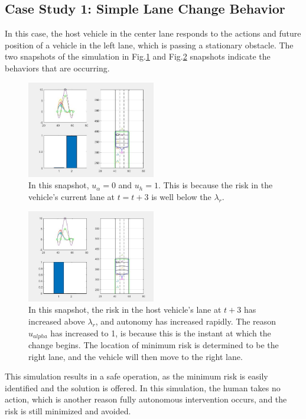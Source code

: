 \documentclass[conference]{IEEEtran}
\begin{document}
\subsection{Case Study 1: Simple Lane Change Behavior}
In this case, the host vehicle in the center lane responds to the actions and future position of a vehicle in the left lane, which is passing a stationary obstacle. The two snapshots of the simulation in Fig.\ref{fig:cs1} and Fig.\ref{fig:cs1b} snapshots indicate the behaviors that are occurring.

\begin{figure}[ht]
    \includegraphics[width=0.5\textwidth]{cs1.JPG}
    \caption{In this snapshot, $u_{\alpha} = 0$ and $u_{h} = 1$. This is because the risk in the vehicle's current lane at $t = t+3$ is well below the $\lambda_{r}$.}
    \label{fig:cs1}
\end{figure}

\begin{figure}[ht]
    \includegraphics[width=0.5\textwidth]{cs1b.JPG}
    \caption{In this snapshot, the risk in the host vehicle's lane at $t+3$ has increased above $\lambda_{r}$, and autonomy has increased rapidly. The reason $u_{alpha}$ has increased to 1, is because this is the instant at which the change begins. The location of minimum risk is determined to be the right lane, and the vehicle will then move to the right lane.}
    \label{fig:cs1b}
\end{figure}

This simulation results in a safe operation, as the minimum risk is easily identified and the solution is offered. In this simulation, the human takes no action, which is another reason fully autonomous intervention occurs, and the risk is still minimized and avoided.
\end{document}
